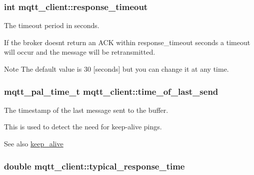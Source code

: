 \subsubsection[{\texorpdfstring{response\+\_\+timeout}{response_timeout}}]{\setlength{\rightskip}{0pt plus 5cm}int mqtt\+\_\+client\+::response\+\_\+timeout}\hypertarget{structmqtt__client_a4ee652148f2b1b338f1527a85879e970}{}\label{structmqtt__client_a4ee652148f2b1b338f1527a85879e970}


The timeout period in seconds. 

If the broker doesn\textquotesingle{}t return an A\+CK within response\+\_\+timeout seconds a timeout will occur and the message will be retransmitted.

\begin{DoxyNote}{Note}
The default value is 30 \mbox{[}seconds\mbox{]} but you can change it at any time. 
\end{DoxyNote}
\subsubsection[{\texorpdfstring{time\+\_\+of\+\_\+last\+\_\+send}{time_of_last_send}}]{\setlength{\rightskip}{0pt plus 5cm}mqtt\+\_\+pal\+\_\+time\+\_\+t mqtt\+\_\+client\+::time\+\_\+of\+\_\+last\+\_\+send}\hypertarget{structmqtt__client_a9e1ad5b2573d6e693a21031a89b1717e}{}\label{structmqtt__client_a9e1ad5b2573d6e693a21031a89b1717e}


The timestamp of the last message sent to the buffer. 

This is used to detect the need for keep-\/alive pings.

\begin{DoxySeeAlso}{See also}
\hyperlink{structmqtt__client_aff533344a060e58277698039f547147a}{keep\+\_\+alive} 
\end{DoxySeeAlso}
\subsubsection[{\texorpdfstring{typical\+\_\+response\+\_\+time}{typical_response_time}}]{\setlength{\rightskip}{0pt plus 5cm}double mqtt\+\_\+client\+::typical\+\_\+response\+\_\+time}\hypertarget{structmqtt__client_a4d1f8c7f4c364b07f75efcaf9613150e}{}\label{structmqtt__client_a4d1f8c7f4c364b07f75efcaf9613150e}


